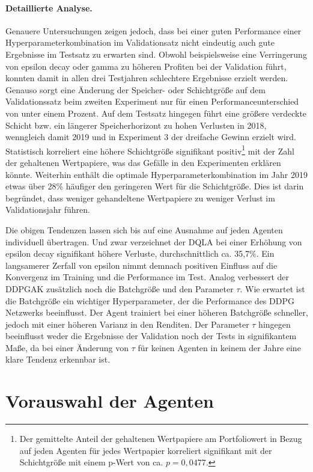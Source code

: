 \paragraph{Detaillierte Analyse.}
Genauere Untersuchungen zeigen jedoch, dass bei einer guten Performance einer Hyperparameterkombination im Validationsatz nicht eindeutig auch gute Ergebnisse im Testsatz zu erwarten sind.
Obwohl beispielsweise eine Verringerung von epsilon decay oder gamma zu höheren Profiten bei der Validation führt, konnten damit in allen drei Testjahren schlechtere Ergebnisse erzielt werden.
Genauso sorgt eine Änderung der Speicher- oder Schichtgröße auf dem Validationssatz beim zweiten Experiment nur für einen Performanceunterschied von unter einem Prozent.
Auf dem Testsatz hingegen führt eine größere verdeckte Schicht bzw. ein längerer Speicherhorizont zu hohen Verlusten in 2018, wenngleich damit 2019 und in Experiment 3 der dreifache Gewinn erzielt wird.
Statistisch korreliert eine höhere Schichtgröße signifikant positiv\footnote{Der gemittelte Anteil der gehaltenen Wertpapiere am Portfoliowert in Bezug auf jeden Agenten für jedes Wertpapier korreliert signifikant mit der Schichtgröße mit einem p-Wert von ca. $p=0,0477$.} mit der Zahl der gehaltenen Wertpapiere, was das Gefälle in den Experimenten erklären könnte. 
Weiterhin enthält die optimale Hyperparameterkombination im Jahr 2019 etwas über 28\% häufiger den geringeren Wert für die Schichtgröße. 
Dies ist darin begründet, dass weniger gehandeltene Wertpapiere zu weniger Verlust im Validationsjahr führen.

Die obigen Tendenzen lassen sich bis auf eine Ausnahme auf jeden Agenten individuell übertragen. Und zwar verzeichnet der \acs{DQLA} bei einer Erhöhung von epsilon decay signifikant höhere Verluste, durchschnittlich ca. 35,7\%. Ein langsamerer Zerfall von epsilon nimmt demnach positiven Einfluss auf die Konvergenz im Training und die Performance im Test.
Analog verbessert der \acs{DDPGAK} zusätzlich noch die Batchgröße und den Parameter $\tau$. 
Wie erwartet ist die Batchgröße ein wichtiger Hyperparameter, der die Performance des \acs{DDPG} Netzwerks beeinflusst. Der Agent trainiert bei einer höheren Batchgröße schneller, jedoch mit einer höheren Varianz in den Renditen.
Der Parameter $\tau$ hingegen beeinflusst weder die Ergebnisse der Validation noch der Tests in signifikantem Maße, da bei einer Änderung von $\tau$ für keinen Agenten in keinem der Jahre eine klare Tendenz erkennbar ist.

\section{Vorauswahl der Agenten}
\label{sec:voragentenerg}

